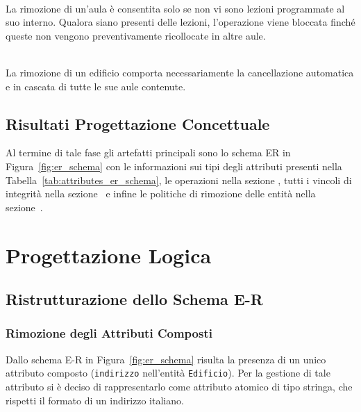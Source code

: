 \documentclass[a4paper,11pt]{article}
\begin{document}
\begin{description}[leftmargin=0pt]
    \item[Eliminazione di un'aula] \hfill \\
    La rimozione di un'aula è consentita solo se non vi sono lezioni programmate al suo interno. Qualora siano presenti delle lezioni, l'operazione viene bloccata finché queste non vengono preventivamente ricollocate in altre aule.

    \item[Eliminazione di un edificio] \hfill \\
    La rimozione di un edificio comporta necessariamente la cancellazione automatica e in cascata di tutte le sue aule contenute.

\end{description}


\subsection{Risultati Progettazione Concettuale}

Al termine di tale fase gli artefatti principali sono lo schema ER in Figura~\ref{fig:er_schema} con le informazioni sui tipi degli attributi presenti nella Tabella~\ref{tab:attributes_er_schema}, le operazioni nella sezione , tutti i vincoli di integrità nella sezione~ e infine le politiche di rimozione delle entità nella sezione~.



\section{Progettazione Logica}

\subsection{Ristrutturazione dello Schema E-R}

\subsubsection{Rimozione degli Attributi Composti}

Dallo schema E-R in Figura~\ref{fig:er_schema} risulta la presenza di un unico attributo composto (\texttt{indirizzo} nell'entità \texttt{Edificio}). Per la gestione di tale attributo si è deciso di rappresentarlo come attributo atomico di tipo stringa, che rispetti il formato di un indirizzo italiano.
\end{document}
